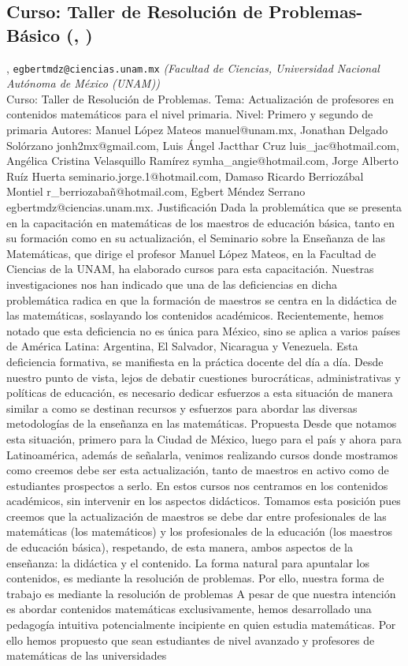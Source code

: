 \subsection{\sffamily Curso: Taller de Resolución de Problemas-Básico {\footnotesize (, )}} \label{reg-599} 
, {\tt egbertmdz@ciencias.unam.mx}  {\slshape (Facultad de Ciencias, Universidad Nacional Autónoma de México (UNAM))}\\
          \noindent Curso: Taller de Resolución de Problemas. Tema: Actualización de profesores en contenidos matemáticos para el nivel primaria. Nivel: Primero y segundo de primaria Autores: Manuel López Mateos manuel@unam.mx, Jonathan Delgado Solórzano jonh2mx@gmail.com, Luis Ángel Jactthar Cruz luis_jac@hotmail.com, Angélica Cristina Velasquillo Ramírez symha_angie@hotmail.com, Jorge Alberto Ruíz Huerta seminario.jorge.1@hotmail.com, Damaso Ricardo Berriozábal Montiel r_berriozabañ@hotmail.com, Egbert Méndez Serrano egbertmdz@ciencias.unam.mx. Justificación Dada la problemática que se presenta en la capacitación en matemáticas de los maestros de educación básica, tanto en su formación como en su actualización, el Seminario sobre la Enseñanza de las Matemáticas, que dirige el profesor Manuel López Mateos, en la Facultad de Ciencias de la UNAM, ha elaborado cursos para esta capacitación. Nuestras investigaciones nos han indicado que una de las deficiencias en dicha problemática radica en que la formación de maestros se centra en la didáctica de las matemáticas, soslayando los contenidos académicos. Recientemente, hemos notado que esta deficiencia no es única para México, sino se aplica a varios países de América Latina: Argentina, El Salvador, Nicaragua y Venezuela. Esta deficiencia formativa, se manifiesta en la práctica docente del día a día. Desde nuestro punto de vista, lejos de debatir cuestiones burocráticas, administrativas y políticas de educación, es necesario dedicar esfuerzos a esta situación de manera similar a como se destinan recursos y esfuerzos para abordar las diversas metodologías de la enseñanza en las matemáticas. Propuesta Desde que notamos esta situación, primero para la Ciudad de México, luego para el país y ahora para Latinoamérica, además de señalarla, venimos realizando cursos donde mostramos como creemos debe ser esta actualización, tanto de maestros en activo como de estudiantes prospectos a serlo. En estos cursos nos centramos en los contenidos académicos, sin intervenir en los aspectos didácticos. Tomamos esta posición pues creemos que la actualización de maestros se debe dar entre profesionales de las matemáticas (los matemáticos) y los profesionales de la educación (los maestros de educación básica), respetando, de esta manera, ambos aspectos de la enseñanza: la didáctica y el contenido. La forma natural para apuntalar los contenidos, es mediante la resolución de problemas. Por ello, nuestra forma de trabajo es mediante la resolución de problemas A pesar de que nuestra intención es abordar contenidos matemáticas exclusivamente, hemos desarrollado una pedagogía intuitiva potencialmente incipiente en quien estudia matemáticas. Por ello hemos propuesto que sean estudiantes de nivel avanzado y profesores de matemáticas de las universidades 